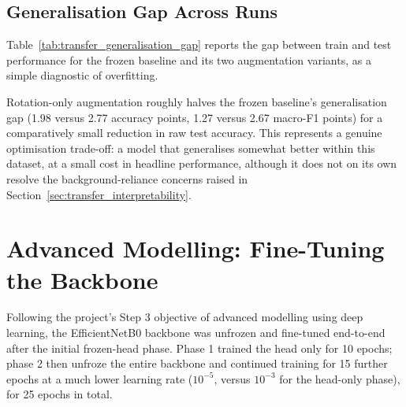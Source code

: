 \subsection{Generalisation Gap Across Runs}
\label{subsec:transfer_generalisation_gap}

Table~\ref{tab:transfer_generalisation_gap} reports the gap between train
and test performance for the frozen baseline and its two augmentation
variants, as a simple diagnostic of overfitting.

\begin{table}[H]
\centering
\caption{Train-test generalisation gap for the frozen-backbone transfer models.}
\label{tab:transfer_generalisation_gap}
\end{table}

Rotation-only augmentation roughly halves the frozen baseline's
generalisation gap (1.98 versus 2.77 accuracy points, 1.27 versus 2.67
macro-F1 points) for a comparatively small reduction in raw test accuracy.
This represents a genuine optimisation trade-off: a model that generalises
somewhat better within this dataset, at a small cost in headline
performance, although it does not on its own resolve the background-reliance
concerns raised in Section~\ref{sec:transfer_interpretability}.

\section{Advanced Modelling: Fine-Tuning the Backbone}
\label{sec:transfer_finetune}

Following the project's Step 3 objective of advanced modelling using deep
learning, the EfficientNetB0 backbone was unfrozen and fine-tuned end-to-end
after the initial frozen-head phase. Phase 1 trained the head only for 10
epochs; phase 2 then unfroze the entire backbone and continued training for
15 further epochs at a much lower learning rate ($10^{-5}$, versus $10^{-3}$
for the head-only phase), for 25 epochs in total.

